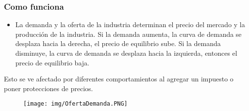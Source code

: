 \documentclass[titlepage,a4paper]{article}
\begin{document}
\subsubsection*{Como funciona}

\begin{itemize}
\item La demanda y la oferta de la industria determinan el precio del mercado y la producción de la industria. Si la demanda aumenta, la curva de demanda se desplaza hacia la derecha, el precio de equilibrio sube. Si la demanda disminuye, la curva de demanda se desplaza hacia la izquierda, entonces el precio de equilibrio baja.
\end{itemize}

Esto se ve afectado por diferentes comportamientos al agregar un impuesto o poner protecciones de precios.

\begin{figure}[!htb]
    \centering
    \texttt{[image: img/OfertaDemanda.PNG]}
\end{figure}


\end{document}
